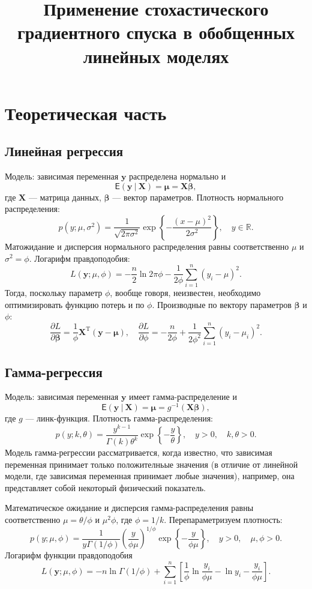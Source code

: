 \documentclass{article}
\title{Применение стохастического градиентного спуска в обобщенных линейных моделях}
\date{}
\begin{document}
\maketitle

\section{Теоретическая часть}
\subsection{Линейная регрессия}
Модель: зависимая переменная $\mathbf{y}$ распределена нормально и
\[
    \mathsf{E}(\mathbf{y}~|~\mathbf{X})=\bm\mu=\mathbf{X} \bm\beta,
\]
где $\mathbf{X}$ — матрица данных, $\boldsymbol\beta$ — вектор параметров. Плотность нормального распределения:
\[
    p(y; \mu, \sigma^2)=\frac1{\sqrt{2\pi\sigma^2}}\exp\left\{-\frac{(x-\mu)^2}{2\sigma^2}\right\},\quad y\in \mathbb{R}.
\]
Матожидание и дисперсия нормального распределения равны соответственно $\mu$ и $\sigma^2=\phi$. Логарифм правдоподобия:
\[
    L(\mathbf{y}; \mu, \phi)=-\frac{n}{2}\ln2\pi\phi-\frac{1}{2\phi}\sum_{i=1}^n(y_i-\mu)^2.
\]
Тогда, поскольку параметр $\phi$, вообще говоря, неизвестен, необходимо оптимизировать функцию потерь и по $\phi$. Производные по вектору параметров $\bm\beta$ и $\phi$:
\[
    \frac{\partial L}{\partial\bm\beta}=\frac1\phi\mathbf{X}^\mathrm{T}(\mathbf{y}-\bm\mu),\quad \frac{\partial L}{\partial \phi}=-\frac{n}{2\phi} + \frac{1}{2\phi^2}\sum_{i=1}^n(y_i-\mu_i)^2.
\]

\subsection{Гамма-регрессия}
Модель: зависимая переменная $\mathbf{y}$ имеет гамма-распределение и
\[
    \mathsf{E}(\mathbf y~|~ \mathbf{X})=\bm\mu=g^{-1}(\mathbf{X}\bm{\beta}),
\]
где $g$ --- линк-функция.
Плотность гамма-распределения:
\[
    p(y; k, \theta) = \frac{y^{k-1}}{\Gamma(k)\theta^k}\exp\left\{-\frac{y}{\theta}\right\},\quad y > 0,\quad k, \theta > 0.
\]
Модель гамма-регрессии рассматривается, когда известно, что зависимая переменная принимает только положителньые значения (в отличие от линейной модели, где зависимая переменная принимает любые значения), например, она представляет собой некоторый физический показатель.

Математическое ожидание и дисперсия гамма-распределения равны соответственно $\mu=\theta/\phi$ и $\mu^2 \phi$, где $\phi=1/k$. Перепараметризуем плотность:
\[
    p(y; \mu, \phi)=\frac{1}{y\Gamma(1/\phi)}\left(\frac{y}{\phi\mu}\right)^{1/\phi} \exp\left\{-\frac{y}{\phi\mu}\right\},\quad y > 0,\quad \mu,\phi>0.
\]
Логарифм функции правдоподобия
\[
    L(\mathbf{y}; \mu, \phi)=-n\ln\Gamma(1/\phi)+\sum_{i=1}^n\left[\frac1\phi\ln\frac{y_i}{\phi\mu} - \ln y_i- \frac{y_i}{\phi\mu} \right].
\]
\end{document}
